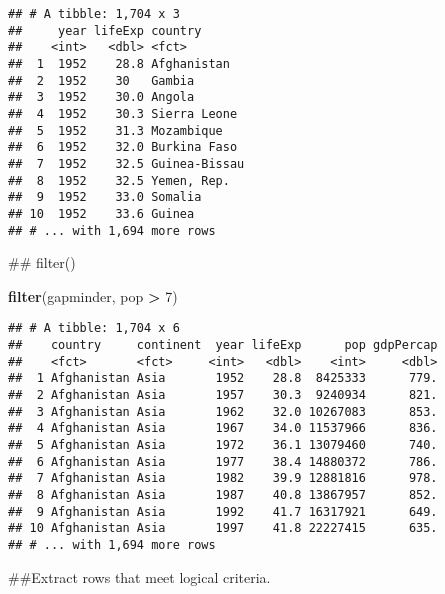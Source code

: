 \documentclass[]{article}
\newenvironment{Shaded}{\begin{snugshade}}{\end{snugshade}}
\newcommand{\DecValTok}[1]{\textcolor[rgb]{0.00,0.00,0.81}{#1}}
\newcommand{\KeywordTok}[1]{\textcolor[rgb]{0.13,0.29,0.53}{\textbf{#1}}}
\newcommand{\NormalTok}[1]{#1}
\newcommand{\OperatorTok}[1]{\textcolor[rgb]{0.81,0.36,0.00}{\textbf{#1}}}
\newcommand{\StringTok}[1]{\textcolor[rgb]{0.31,0.60,0.02}{#1}}
\begin{document}
\begin{Shaded}
\end{Shaded}

\begin{verbatim}
## # A tibble: 1,704 x 3
##     year lifeExp country      
##    <int>   <dbl> <fct>        
##  1  1952    28.8 Afghanistan  
##  2  1952    30   Gambia       
##  3  1952    30.0 Angola       
##  4  1952    30.3 Sierra Leone 
##  5  1952    31.3 Mozambique   
##  6  1952    32.0 Burkina Faso 
##  7  1952    32.5 Guinea-Bissau
##  8  1952    32.5 Yemen, Rep.  
##  9  1952    33.0 Somalia      
## 10  1952    33.6 Guinea       
## # ... with 1,694 more rows
\end{verbatim}

\begin{Shaded}
\begin{Highlighting}[]
\NormalTok{## filter()}

\KeywordTok{filter}\NormalTok{(gapminder, pop }\OperatorTok{>}\StringTok{ }\DecValTok{7}\NormalTok{)}
\end{Highlighting}
\end{Shaded}

\begin{verbatim}
## # A tibble: 1,704 x 6
##    country     continent  year lifeExp      pop gdpPercap
##    <fct>       <fct>     <int>   <dbl>    <int>     <dbl>
##  1 Afghanistan Asia       1952    28.8  8425333      779.
##  2 Afghanistan Asia       1957    30.3  9240934      821.
##  3 Afghanistan Asia       1962    32.0 10267083      853.
##  4 Afghanistan Asia       1967    34.0 11537966      836.
##  5 Afghanistan Asia       1972    36.1 13079460      740.
##  6 Afghanistan Asia       1977    38.4 14880372      786.
##  7 Afghanistan Asia       1982    39.9 12881816      978.
##  8 Afghanistan Asia       1987    40.8 13867957      852.
##  9 Afghanistan Asia       1992    41.7 16317921      649.
## 10 Afghanistan Asia       1997    41.8 22227415      635.
## # ... with 1,694 more rows
\end{verbatim}

\begin{Shaded}
\begin{Highlighting}[]
\NormalTok{##Extract rows that meet logical criteria. }
\end{Highlighting}
\end{Shaded}
\end{document}
